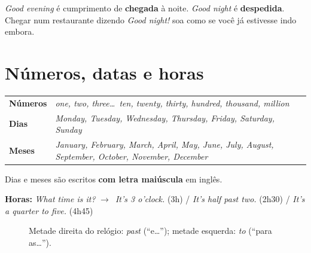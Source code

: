 \documentclass[12pt,a4paper,oneside]{book}
\newcommand{\en}[1]{\textit{#1}}                 %
\newcommand{\ra}{$\rightarrow$}
\begin{document}
\begin{cuidado}
\en{Good evening} é cumprimento de \textbf{chegada} à noite. \en{Good night} é \textbf{despedida}. Chegar num restaurante dizendo \en{Good night!} soa como se você já estivesse indo embora.
\end{cuidado}

\section{Números, datas e horas}

\begin{center}
\begin{tabularx}{\textwidth}{@{}lX@{}}
\toprule
\textbf{Números} & \en{one, two, three\ldots\ ten, twenty, thirty, hundred, thousand, million} \\
\textbf{Dias} & \en{Monday, Tuesday, Wednesday, Thursday, Friday, Saturday, Sunday} \\
\textbf{Meses} & \en{January, February, March, April, May, June, July, August, September, October, November, December} \\
\bottomrule
\end{tabularx}
\end{center}

Dias e meses são escritos \textbf{com letra maiúscula} em inglês.

\textbf{Horas:} \en{What time is it?} \ra\ \en{It's 3 o'clock.} (3h) / \en{It's half past two.} (2h30) / \en{It's a quarter to five.} (4h45)

\begin{figure}[H]
\centering
{}
\caption{Metade direita do relógio: \en{past} (``e\ldots''); metade esquerda: \en{to} (``para as\ldots'').}
\end{figure}
\end{document}

